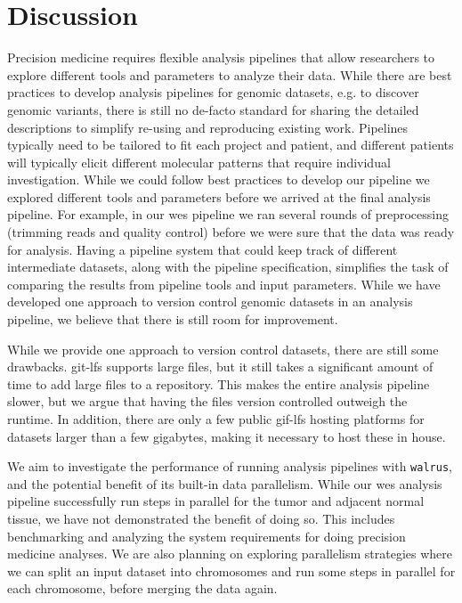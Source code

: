 \section{Discussion}
Precision medicine requires flexible analysis pipelines that allow researchers
to explore different tools and parameters to analyze their data.  While there
are best practices to develop analysis pipelines for genomic datasets, e.g. to
discover genomic variants, there is still no de-facto standard for sharing the
detailed descriptions to simplify re-using and reproducing existing work.
Pipelines typically need to be tailored to fit each project and patient, and
different patients will typically elicit different molecular patterns that
require individual investigation. While we could follow best practices to
develop our pipeline we explored different tools and parameters before we
arrived at the final analysis pipeline.  For example, in our \gls{wes} pipeline
we ran several rounds of preprocessing (trimming reads and quality control)
before we were sure that the data was ready for analysis. Having a pipeline
system that could keep track of different intermediate datasets, along with the
pipeline specification, simplifies the task of comparing the results from
pipeline tools and input parameters. While we have developed one approach to
version control genomic datasets in an analysis pipeline, we believe that there
is still room for improvement. 

While we provide one approach to version control datasets, there are still some
drawbacks. git-lfs supports large files, but it still takes a significant amount
of time to add large files to a repository.  This makes the entire analysis
pipeline slower, but we argue that having the files version controlled outweigh
the runtime. In addition, there are only a few public gif-lfs hosting platforms
for datasets larger than a few gigabytes, making it necessary to host these
in house. 

We aim to investigate the performance of running analysis pipelines with
\texttt{walrus}, and the potential benefit of its built-in data parallelism.
While our \gls{wes} analysis pipeline successfully run steps in parallel for the
tumor and adjacent normal tissue, we have not demonstrated the benefit
of doing so. This includes benchmarking and analyzing the system requirements
for doing precision medicine analyses.  We are also planning on exploring
parallelism strategies where we can split an input dataset into chromosomes and
run some steps in parallel for each chromosome, before merging the data again. 
 

